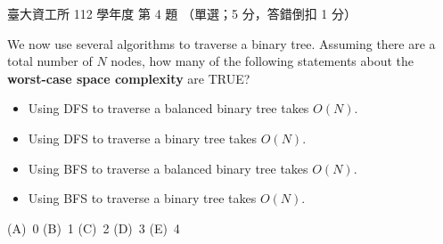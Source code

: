 \begin{pastexam}[label={px:ntu-112-dsa-04}]{臺大資工所 112 學年度 第 4 題}
（單選；5 分，答錯倒扣 1 分）

We now use several algorithms to traverse a binary tree. Assuming there are a total number of $N$
nodes, how many of the following statements about the \textbf{worst-case space complexity} are TRUE?
\begin{itemize}
\item Using DFS to traverse a balanced binary tree takes $O(N)$.
\item Using DFS to traverse a binary tree takes $O(N)$.
\item Using BFS to traverse a balanced binary tree takes $O(N)$.
\item Using BFS to traverse a binary tree takes $O(N)$.
\end{itemize}
(A)~0 \qquad (B)~1 \qquad (C)~2 \qquad (D)~3 \qquad (E)~4
\end{pastexam}

